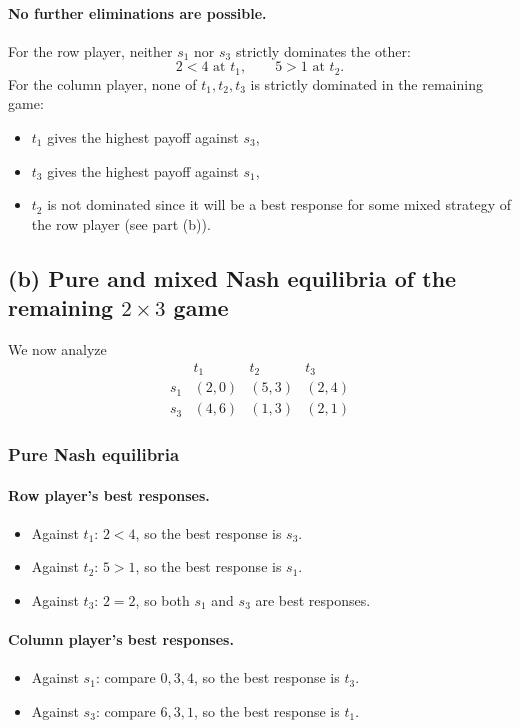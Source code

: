 \paragraph{No further eliminations are possible.}
For the row player, neither \(s_1\) nor \(s_3\) strictly dominates the other:
\[
2<4 \text{ at } t_1,\qquad 5>1 \text{ at } t_2.
\]
For the column player, none of \(t_1,t_2,t_3\) is strictly dominated in the remaining game:
\begin{itemize}
\item \(t_1\) gives the highest payoff against \(s_3\),
\item \(t_3\) gives the highest payoff against \(s_1\),
\item \(t_2\) is not dominated since it will be a best response for some mixed strategy of the row player (see part (b)).
\end{itemize}

\subsection*{(b) Pure and mixed Nash equilibria of the remaining \(2\times 3\) game}

We now analyze
\[
\begin{array}{c|ccc}
 & t_1 & t_2 & t_3\\
\hline
s_1 & (2,0) & (5,3) & (2,4)\\
s_3 & (4,6) & (1,3) & (2,1)
\end{array}
\]

\subsubsection*{Pure Nash equilibria}

\paragraph{Row player's best responses.}
\begin{itemize}
\item Against \(t_1\): \(2<4\), so the best response is \(s_3\).
\item Against \(t_2\): \(5>1\), so the best response is \(s_1\).
\item Against \(t_3\): \(2=2\), so both \(s_1\) and \(s_3\) are best responses.
\end{itemize}

\paragraph{Column player's best responses.}
\begin{itemize}
\item Against \(s_1\): compare \(0,3,4\), so the best response is \(t_3\).
\item Against \(s_3\): compare \(6,3,1\), so the best response is \(t_1\).
\end{itemize}

